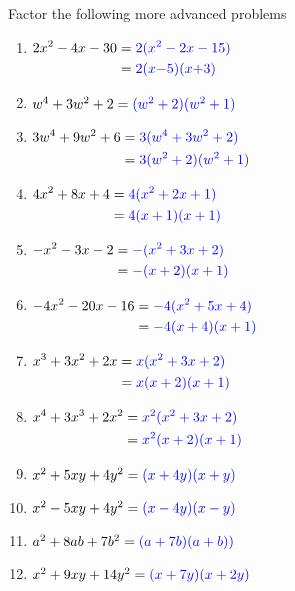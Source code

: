 \begin{myexample}
Factor the following more advanced problems
\end{myexample}
\begin{multicols}{2}
	\begin{enumerate}
		\item $
		\begin{aligned}[t]
			2x^2-4x-30 & =  {\color{blue}{2({x^2-2x-15})}}  \\
			           & =  {\color{blue}{2(x{-5})(x{+3})}} 
		\end{aligned}
		$
		\item $w^4+3w^2+2 = {\color{blue}{(w^2+2)(w^2+1)}}$
		\item $
		\begin{aligned}[t]
			3w^4+9w^2+6 & = {\color{blue}{3(w^4+3w^2+2)}}    \\
			            & =  {\color{blue}{3(w^2+2)(w^2+1)}} 
		\end{aligned}
		$
		\item $
		\begin{aligned}[t]
			4x^2+8x+4 & =  {\color{blue}{4(x^2+2x+1)}} \\
			          & =  {\color{blue}{4(x+1)(x+1)}} 
		\end{aligned}
		$
		\item $
		\begin{aligned}[t]
			-x^2-3x-2 & =  {\color{blue}{-(x^2+3x+2)}} \\
			          & =  {\color{blue}{-(x+2)(x+1)}} 
		\end{aligned}
		$
		\item $
		\begin{aligned}[t]
			-4x^2-20x-16 & =  {\color{blue}{-4(x^2+5x+4)}} \\
			             & =  {\color{blue}{-4(x+4)(x+1)}} 
		\end{aligned}
		$
		\item $
		\begin{aligned}[t]
			x^3+3x^2+2x & =  {\color{blue}{x(x^2+3x+2)}} \\
			            & =  {\color{blue}{x(x+2)(x+1)}} 
		\end{aligned}
		$
		\item $
		\begin{aligned}[t]
			x^4+3x^3+2x^2 & =  {\color{blue}{x^2(x^2+3x+2)}} \\
			              & =  {\color{blue}{x^2(x+2)(x+1)}} 
		\end{aligned}
		$
		\item $x^2+5xy+4y^2={\color{blue}{(x+4y)(x+y)}}$
		\item $x^2-5xy+4y^2={\color{blue}{(x-4y)(x-y)}}$
		\item $a^2+8ab+7b^2={\color{blue}{(a+7b)(a+b))}}$
		\item $x^2+9xy+14y^2={\color{blue}{(x+7y)(x+2y)}}$
	\end{enumerate}
\end{multicols}

